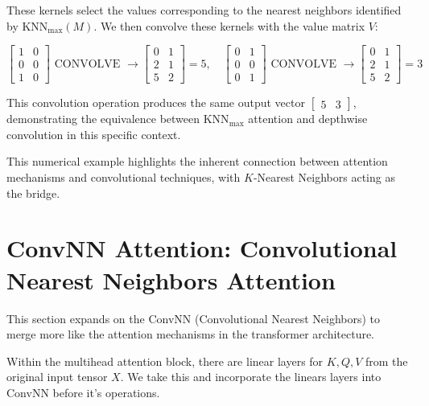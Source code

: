 \documentclass{article}
\begin{document}
These kernels select the values corresponding to the nearest neighbors identified by $\text{KNN}_{\text{max}}(M)$. We then convolve these kernels with the value matrix $V$:

\[
\begin{bmatrix}
1 & 0 \\
0 & 0 \\
1 & 0
\end{bmatrix}
\text{ CONVOLVE } \xrightarrow{}
\begin{bmatrix}
0 & 1 \\
2 & 1 \\
5 & 2
\end{bmatrix}
= 5, \quad
\begin{bmatrix}
0 & 1 \\
0 & 0 \\
0 & 1
\end{bmatrix}
\text{ CONVOLVE } \xrightarrow{}
\begin{bmatrix}
0 & 1 \\
2 & 1 \\
5 & 2
\end{bmatrix}
= 3
\]

This convolution operation produces the same output vector $\begin{bmatrix} 5 & 3 \end{bmatrix}$, demonstrating the equivalence between $\text{KNN}_{\text{max}}$ attention and depthwise convolution in this specific context.

This numerical example highlights the inherent connection between attention mechanisms and convolutional techniques, with $K$-Nearest Neighbors acting as the bridge.

\section{ConvNN Attention: Convolutional Nearest Neighbors Attention}
This section expands on the ConvNN (Convolutional Nearest Neighbors) to merge more like the attention mechanisms in the transformer architecture. 

Within the multihead attention block, there are linear layers for \(K, Q, V\) from the original input tensor \(X\). We take this and incorporate the linears layers into ConvNN before it's operations. 
\end{document}
